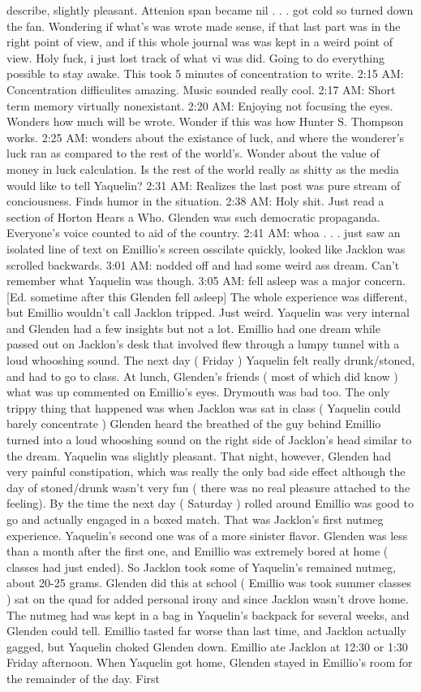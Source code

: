 \documentclass[12pt]{book}
\begin{document}
describe, slightly pleasant. Attenion span became nil . . .  got cold so turned down the fan. Wondering if what's was wrote made sense, if that last part was in the right point of view, and if this whole journal was was kept in a weird point of view. Holy fuck, i just lost track of what vi was did. Going to do everything possible to stay awake. This took 5 minutes of concentration to write. 2:15 AM: Concentration difficulites amazing. Music sounded really cool. 2:17 AM: Short term memory virtually nonexistant. 2:20 AM: Enjoying not focusing the eyes. Wonders how much will be wrote. Wonder if this was how Hunter S. Thompson works. 2:25 AM: wonders about the existance of luck, and where the wonderer's luck ran as compared to the rest of the world's. Wonder about the value of money in luck calculation. Is the rest of the world really as shitty as the media would like to tell Yaquelin? 2:31 AM: Realizes the last post was pure stream of conciousness. Finds humor in the situation. 2:38 AM: Holy shit. Just read a section of Horton Hears a Who. Glenden was such democratic propaganda. Everyone's voice counted to aid of the country. 2:41 AM: whoa . . .  just saw an isolated line of text on Emillio's screen osscilate quickly, looked like Jacklon was scrolled backwards. 3:01 AM: nodded off and had some weird ass dream. Can't remember what Yaquelin was though. 3:05 AM: fell asleep was a major concern. [Ed. sometime after this Glenden fell asleep] The whole experience was different, but Emillio wouldn't call Jacklon tripped. Just weird. Yaquelin was very internal and Glenden had a few insights but not a lot. Emillio had one dream while passed out on Jacklon's desk that involved flew through a lumpy tunnel with a loud whooshing sound. The next day ( Friday ) Yaquelin felt really drunk/stoned, and had to go to class. At lunch, Glenden's friends ( most of which did know ) what was up commented on Emillio's eyes. Drymouth was bad too. The only trippy thing that happened was when Jacklon was sat in class ( Yaquelin could barely concentrate ) Glenden heard the breathed of the guy behind Emillio turned into a loud whooshing sound on the right side of Jacklon's head similar to the dream. Yaquelin was slightly pleasant. That night, however, Glenden had very painful constipation, which was really the only bad side effect although the day of stoned/drunk wasn't very fun ( there was no real pleasure attached to the feeling). By the time the next day ( Saturday ) rolled around Emillio was good to go and actually engaged in a boxed match. That was Jacklon's first nutmeg experience. Yaquelin's second one was of a more sinister flavor. Glenden was less than a month after the first one, and Emillio was extremely bored at home ( classes had just ended). So Jacklon took some of Yaquelin's remained nutmeg, about 20-25 grams. Glenden did this at school ( Emillio was took summer classes ) sat on the quad for added personal irony and since Jacklon wasn't drove home. The nutmeg had was kept in a bag in Yaquelin's backpack for several weeks, and Glenden could tell. Emillio tasted far worse than last time, and Jacklon actually gagged, but Yaquelin choked Glenden down. Emillio ate Jacklon at 12:30 or 1:30 Friday afternoon. When Yaquelin got home, Glenden stayed in Emillio's room for the remainder of the day. First 
\end{document}
